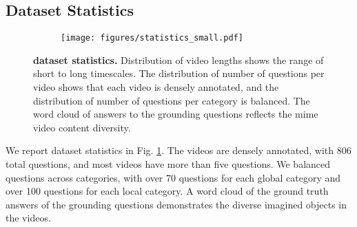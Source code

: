 \subsection{Dataset Statistics}

\begin{figure}[t!]
  \centering
  \begin{subfigure}{\linewidth}
      \texttt{[image: figures/statistics\_small.pdf]}
  \end{subfigure}
  
  \begin{subfigure}{\linewidth}
  \centering
  \end{subfigure}
  \vspace{2mm}
  \caption{\textbf{{\data} dataset statistics.} Distribution of video lengths shows the range of short to long timescales. The distribution of number of questions per video shows that each video is densely annotated, and the distribution of number of questions per category is balanced. The word cloud of answers to the grounding questions reflects the mime video content diversity.}
  \vspace{-2mm}
  \label{fig:statistics}
\end{figure}

We report dataset statistics in Fig. \ref{fig:statistics}. The videos are densely annotated, with 806 total questions, and most videos have more than five questions. We balanced questions across categories, with over 70 questions for each global category and over 100 questions for each local category. A word cloud of the ground truth answers of the grounding questions demonstrates the diverse imagined objects in the videos. 